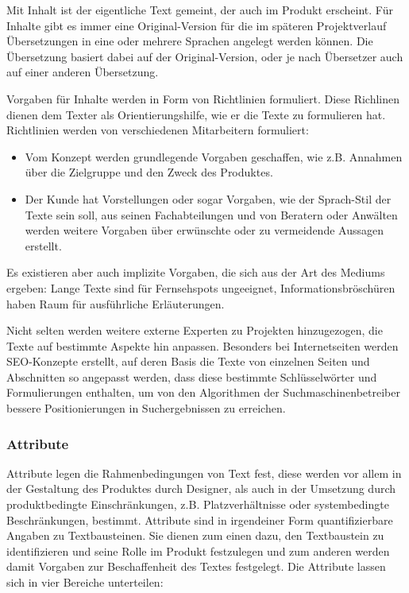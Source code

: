 Mit Inhalt ist der eigentliche Text gemeint, der auch im Produkt erscheint. Für Inhalte gibt es immer eine Original-Version für die im späteren Projektverlauf Übersetzungen in eine oder mehrere Sprachen angelegt werden können. Die Übersetzung basiert dabei auf der Original-Version, oder je nach Übersetzer auch auf einer anderen Übersetzung.

Vorgaben für Inhalte werden in Form von Richtlinien formuliert. Diese Richlinen dienen dem Texter als Orientierungshilfe, wie er die Texte zu formulieren hat. Richtlinien werden von verschiedenen Mitarbeitern formuliert: 
\begin{itemize}\itemsep -5pt
\item Vom Konzept werden grundlegende Vorgaben geschaffen, wie z.B. Annahmen über die Zielgruppe und den Zweck des Produktes.
\item Der Kunde hat Vorstellungen oder sogar Vorgaben, wie der Sprach-Stil der Texte sein soll, aus seinen Fachabteilungen und von Beratern oder Anwälten werden weitere Vorgaben über erwünschte oder zu vermeidende Aussagen erstellt.
\end{itemize}
Es existieren aber auch implizite Vorgaben, die sich aus der Art des Mediums ergeben: Lange Texte sind für Fernsehspots ungeeignet, Informationsbröschüren haben Raum für ausführliche Erläuterungen.

Nicht selten werden weitere externe Experten zu Projekten hinzugezogen, die Texte auf bestimmte Aspekte hin anpassen. Besonders bei Internetseiten werden SEO-Konzepte erstellt, auf deren Basis die Texte von einzelnen Seiten und Abschnitten so angepasst werden, dass diese bestimmte Schlüsselwörter und Formulierungen enthalten, um von den Algorithmen der Suchmaschinenbetreiber bessere Positionierungen in Suchergebnissen zu erreichen.

\subsubsection{Attribute} 

Attribute legen die Rahmenbedingungen von Text fest, diese werden vor allem in der Gestaltung des Produktes durch Designer, als auch in der Umsetzung durch produktbedingte Einschränkungen, z.B. Platzverhältnisse oder systembedingte Beschränkungen, bestimmt. Attribute sind in irgendeiner Form quantifizierbare Angaben zu Textbausteinen. Sie dienen zum einen dazu, den Textbaustein zu identifizieren und seine Rolle im Produkt festzulegen und zum anderen werden damit Vorgaben zur Beschaffenheit des Textes festgelegt. Die Attribute lassen sich in vier Bereiche unterteilen:

